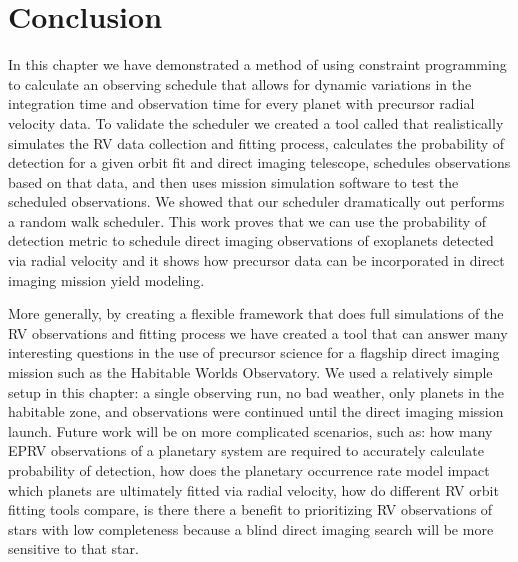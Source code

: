 \section{Conclusion}

In this chapter we have demonstrated a method of using constraint programming
to calculate an observing schedule that allows for dynamic variations in the
integration time and observation time for every planet with precursor radial
velocity data. To validate the scheduler we created a tool called 
that realistically simulates the RV data collection and fitting process,
calculates the probability of detection for a given orbit fit and direct
imaging telescope, schedules observations based on that data, and then uses
mission simulation software to test the scheduled observations. We showed that
our scheduler dramatically out performs a random walk scheduler. This work
proves that we can use the probability of detection metric to schedule direct
imaging observations of exoplanets detected via radial velocity and it shows
how precursor data can be incorporated in direct imaging mission yield
modeling.

More generally, by creating a flexible framework that does full simulations of
the RV observations and fitting process we have created a tool that can answer
many interesting questions in the use of precursor science for a flagship
direct imaging mission such as the Habitable Worlds Observatory. We used a
relatively simple setup in this chapter: a single observing run, no bad
weather, only planets in the habitable zone, and observations were continued
until the direct imaging mission launch. Future work will be on more
complicated scenarios, such as: how many EPRV observations of a planetary
system are required to accurately calculate probability of detection, how does
the planetary occurrence rate model impact which planets are ultimately fitted
via radial velocity, how do different RV orbit fitting tools compare, is there
there a benefit to prioritizing RV observations of stars with low completeness
because a blind direct imaging search will be more sensitive to that star.

